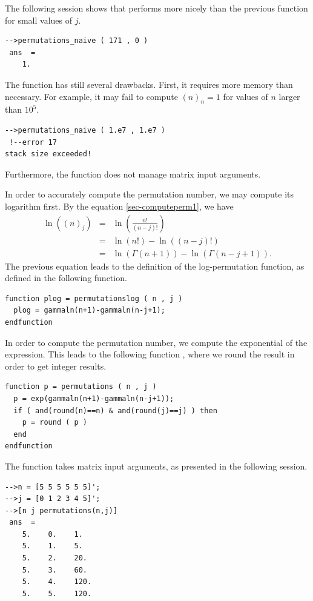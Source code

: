 The following session shows that  
performs more nicely than the previous function for small 
values of $j$.
\lstset{language=scilabscript}
\begin{lstlisting}
-->permutations_naive ( 171 , 0 )
 ans  =
    1.  
\end{lstlisting}

The  function has still several drawbacks.
First, it requires more memory than necessary. 
For example, it may fail to compute $(n)_n=1$ for values of 
$n$ larger than $10^5$. 
\lstset{language=scilabscript}
\begin{lstlisting}
-->permutations_naive ( 1.e7 , 1.e7 )
 !--error 17 
stack size exceeded!
\end{lstlisting}

Furthermore, the function  does not manage 
matrix input arguments. 

In order to accurately compute the permutation number, we may compute its 
logarithm first. 
By the equation \ref{sec-computeperm1}, we have 
\begin{eqnarray}
\ln((n)_j) 
&=& \ln\left(\frac{n!}{(n-j)!}\right) \\
&=& \ln(n!) - \ln((n-j)!) \\
&=& \ln(\Gamma(n+1)) - \ln(\Gamma(n-j+1)).
\end{eqnarray}
The previous equation leads to the definition of the log-permutation 
function, as defined in the following function.
\lstset{language=scilabscript}
\begin{lstlisting}
function plog = permutationslog ( n , j )
  plog = gammaln(n+1)-gammaln(n-j+1);
endfunction
\end{lstlisting}
In order to compute the permutation number, we compute the exponential of the 
expression. This leads to the following function ,
where we round the result in order to get integer results.
\lstset{language=scilabscript}
\begin{lstlisting}
function p = permutations ( n , j )
  p = exp(gammaln(n+1)-gammaln(n-j+1));
  if ( and(round(n)==n) & and(round(j)==j) ) then
    p = round ( p )
  end
endfunction
\end{lstlisting}

The  function takes matrix input arguments, as presented in the 
following session. 
\lstset{language=scilabscript}
\begin{lstlisting}
-->n = [5 5 5 5 5 5]';
-->j = [0 1 2 3 4 5]';
-->[n j permutations(n,j)]
 ans  =
    5.    0.    1.    
    5.    1.    5.    
    5.    2.    20.   
    5.    3.    60.   
    5.    4.    120.  
    5.    5.    120.  
\end{lstlisting}

